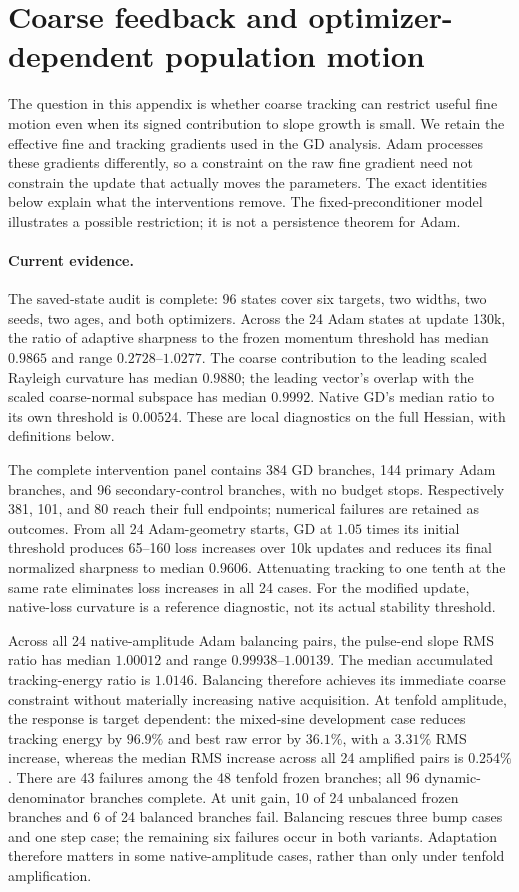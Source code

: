 \section{Coarse feedback and optimizer-dependent population motion}
\label{app:coarse-feedback}

The question in this appendix is whether coarse tracking can restrict useful
fine motion even when its signed contribution to slope growth is small.
We retain the effective fine and tracking gradients used in the GD analysis.
Adam processes these gradients differently, so a constraint on the raw fine
gradient need not constrain the update that actually moves the parameters.
The exact identities below explain what the interventions remove. The
fixed-preconditioner model illustrates a possible restriction; it is not a
persistence theorem for Adam.

\paragraph{Current evidence.}
The saved-state audit is complete: 96 states cover six targets, two widths,
two seeds, two ages, and both optimizers. Across the 24 Adam states at update
130k, the ratio of adaptive sharpness to the frozen momentum threshold has
median $0.9865$ and range $0.2728$--$1.0277$. The coarse contribution to the
leading scaled Rayleigh curvature has median $0.9880$; the leading vector's
overlap with the scaled coarse-normal subspace has median $0.9992$.
Native GD's median ratio to its own threshold is $0.00524$.
These are local diagnostics on the full Hessian, with definitions below.

The complete intervention panel contains 384 GD branches, 144 primary Adam
branches, and 96 secondary-control branches, with no budget stops. Respectively
381, 101, and 80 reach their full endpoints; numerical failures are retained
as outcomes. From all 24 Adam-geometry starts, GD at $1.05$ times its
initial threshold produces 65--160 loss increases over 10k updates and
reduces its final normalized sharpness to median $0.9606$. Attenuating
tracking to one tenth at the same rate eliminates loss increases in all
24 cases. For the modified update, native-loss curvature is a reference
diagnostic, not its actual stability threshold.

Across all 24 native-amplitude Adam balancing pairs, the
pulse-end slope RMS ratio has median $1.00012$ and range
$0.99938$--$1.00139$. The median accumulated tracking-energy ratio is
$1.0146$. Balancing therefore achieves its immediate coarse constraint
without materially increasing native acquisition. At tenfold amplitude,
the response is target dependent: the mixed-sine development case reduces
tracking energy by $96.9\%$ and best raw error by $36.1\%$, with a $3.31\%$
RMS increase, whereas the median RMS increase across all 24 amplified
pairs is $0.254\%$. There are 43 failures among the 48 tenfold frozen
branches; all 96 dynamic-denominator branches complete. At unit gain,
10 of 24 unbalanced frozen branches and 6 of 24 balanced branches fail.
Balancing rescues three bump cases and one step case; the remaining six
failures occur in both variants. Adaptation therefore matters in some
native-amplitude cases, rather than only under tenfold amplification.

